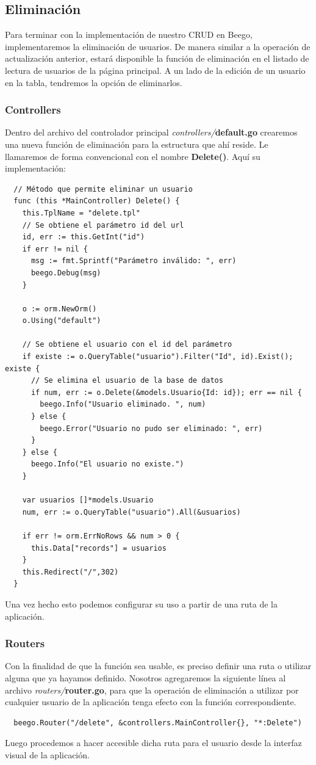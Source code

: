 \documentclass[12pt]{article}
\begin{document}
\subsection{Eliminación}
Para terminar con la implementación de nuestro CRUD en Beego, implementaremos
la eliminación de usuarios. De manera similar a la operación de actualización
anterior, estará disponible la función de eliminación en el listado de lectura
de usuarios de la página principal. A un lado de la edición de un usuario en la
tabla, tendremos la opción de eliminarlos.
\subsubsection{Controllers}
Dentro del archivo del controlador principal \textit{controllers/}\textbf{default.go}
crearemos una nueva función de eliminación para la estructura que ahí reside.
Le llamaremos de forma convencional con el nombre \textbf{Delete()}.
Aquí su implementación:
\begin{verbatim}
  // Método que permite eliminar un usuario
  func (this *MainController) Delete() {
    this.TplName = "delete.tpl"
    // Se obtiene el parámetro id del url
    id, err := this.GetInt("id")
    if err != nil {
      msg := fmt.Sprintf("Parámetro inválido: ", err)
      beego.Debug(msg)
    }

    o := orm.NewOrm()
    o.Using("default")

    // Se obtiene el usuario con el id del parámetro
    if existe := o.QueryTable("usuario").Filter("Id", id).Exist(); existe {
      // Se elimina el usuario de la base de datos
      if num, err := o.Delete(&models.Usuario{Id: id}); err == nil {
        beego.Info("Usuario eliminado. ", num)
      } else {
        beego.Error("Usuario no pudo ser eliminado: ", err)
      }
    } else {
      beego.Info("El usuario no existe.")
    }
    
    var usuarios []*models.Usuario
    num, err := o.QueryTable("usuario").All(&usuarios)

    if err != orm.ErrNoRows && num > 0 {
      this.Data["records"] = usuarios
    }
    this.Redirect("/",302)
  }  
\end{verbatim}
Una vez hecho esto podemos configurar su uso a partir de una ruta de la aplicación.
\subsubsection{Routers}
Con la finalidad de que la función sea usable, es preciso definir una ruta o utilizar
alguna que ya hayamos definido. Nosotros agregaremos la siguiente línea al archivo
\textit{routers/}\textbf{router.go}, para que
la operación de eliminación a utilizar por cualquier usuario de la aplicación tenga
efecto con la función correspondiente.
\begin{verbatim}
  beego.Router("/delete", &controllers.MainController{}, "*:Delete")	  
\end{verbatim}
Luego procedemos a hacer accesible dicha ruta para el usuario desde la interfaz visual
de la aplicación.
\end{document}
